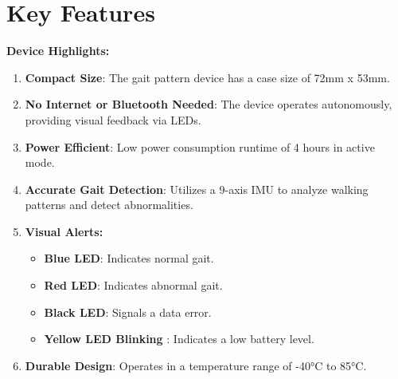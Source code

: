\section{Key Features}

\textbf{Device Highlights:}

\begin{enumerate}
	\item \textbf{Compact Size}: The gait pattern device has a case size of 72mm x 53mm.
	\item \textbf{No Internet or Bluetooth Needed}: The device operates autonomously, providing visual feedback via LEDs.
	\item \textbf{Power Efficient}: Low power consumption  runtime of 4 hours in active mode.
	\item \textbf{Accurate Gait Detection}: Utilizes a 9-axis IMU to analyze walking patterns and detect abnormalities.
	\item \textbf{Visual Alerts:}
	
	\begin{itemize}
		\item \textbf{Blue LED}: Indicates normal gait.
		
		
		\item \textbf{Red LED}: Indicates abnormal gait.
	
		
		
		\item \textbf{Black LED}: Signals a data error.
		
		
		
		\item \textbf{Yellow LED Blinking }:  Indicates a low battery level.
		
	\end{itemize}
	\item \textbf{Durable Design}: Operates in a temperature range of -40°C to 85°C.
\end{enumerate}

